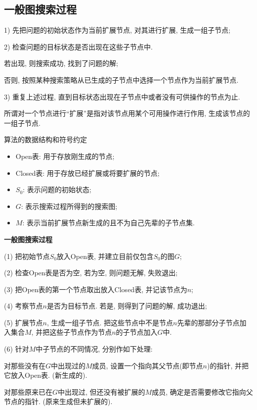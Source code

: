 \subsection{一般图搜索过程}
1) 先把问题的初始状态作为当前扩展节点, 对其进行扩展, 生成一组子节点;

2) 检查问题的目标状态是否出现在这些子节点中.

\qquad{} 若出现, 则搜索成功, 找到了问题的解;

\qquad{} 否则, 按照某种搜索策略从已生成的子节点中选择一个节点作为当前扩展节点.

3) 重复上述过程, 直到目标状态出现在子节点中或者没有可供操作的节点为止.

\begin{remark}
    所谓对一个节点进行“扩展”是指对该节点用某个可用操作进行作用, 生成该节点的一组子节点.
\end{remark}

算法的数据结构和符号约定
\begin{itemize}
\item Open表: 用于存放刚生成的节点;
\item Closed表: 用于存放已经扩展或将要扩展的节点;
\item $S_0$: 表示问题的初始状态;
\item $G$: 表示搜索过程所得到的搜索图;
\item $M$: 表示当前扩展节点新生成的且不为自己先辈的子节点集.
\end{itemize}

\textbf{一般图搜索过程}

\quad (1) 把初始节点$S_0$放入Open表, 并建立目前仅包含$S_0$的图$G$;

\quad (2) 检查Open表是否为空, 若为空, 则问题无解, 失败退出;

\quad (3) 把Open表的第一个节点取出放入Closed表, 并记该节点为$n$;

\quad (4) 考察节点$n$是否为目标节点. 若是, 则得到了问题的解, 成功退出;

\quad (5) 扩展节点$n$, 生成一组子节点. 把这些节点中不是节点$n$先辈的那部分子节点加入集合$M$, 并把这些子节点作为节点$n$的子节点加入$G$中.

\quad (6) 针对$M$中子节点的不同情况, 分别作如下处理:

    \quad \quad {} 对那些没有在$G$中出现过的$M$成员, 设置一个指向其父节点(即节点$n$)的指针, 并把它放入Open表. (新生成的).

    \quad \quad {} 对那些原来已在$G$中出现过, 但还没有被扩展的$M$成员, 确定是否需要修改它指向父节点的指针. (原来生成但未扩展的).

